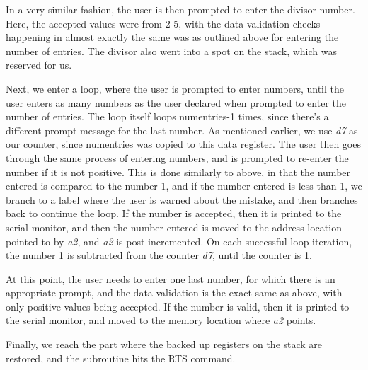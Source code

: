 \documentclass[letterpaper]{article}
\begin{document}
    In a very similar fashion, the user is then prompted to enter the divisor number.
    Here, the accepted values were from 2-5, with the data validation checks happening in
    almost exactly the same was as outlined above for entering the number of entries.
    The divisor also went into a spot on the stack, which was reserved for us.

    Next, we enter a loop, where the user is prompted to enter numbers, until
    the user enters as many numbers as the user declared when prompted to enter the number of entries.
    The loop itself loops numentries-1 times, since there's a different prompt message for the
    last number. As mentioned earlier, we use \textit{d7} as our counter, since numentries was
    copied to this data register. The user then goes through the same process of
    entering numbers, and is prompted to re-enter the number if it is not positive.
    This is done similarly to above, in that the number entered is compared to the
    number 1, and if the number entered is less than 1, we branch to a label where
    the user is warned about the mistake, and then branches back to continue the loop.
    If the number is accepted, then it is printed to the serial monitor, and then the
    number entered is moved to the address location pointed to by \textit{a2}, and \textit{a2} is post
    incremented. On each successful loop iteration, the number 1 is subtracted from
    the counter \textit{d7}, until the counter is 1.

    At this point, the user needs to enter one last number, for which there is
    an appropriate prompt, and the data validation is the exact same as above,
    with only positive values being accepted. If the number is valid, then it is
    printed to the serial monitor, and moved to the memory location where \textit{a2} points.

    Finally, we reach the part where the backed up registers on the stack are restored,
    and the subroutine hits the RTS command.

\end{document}
